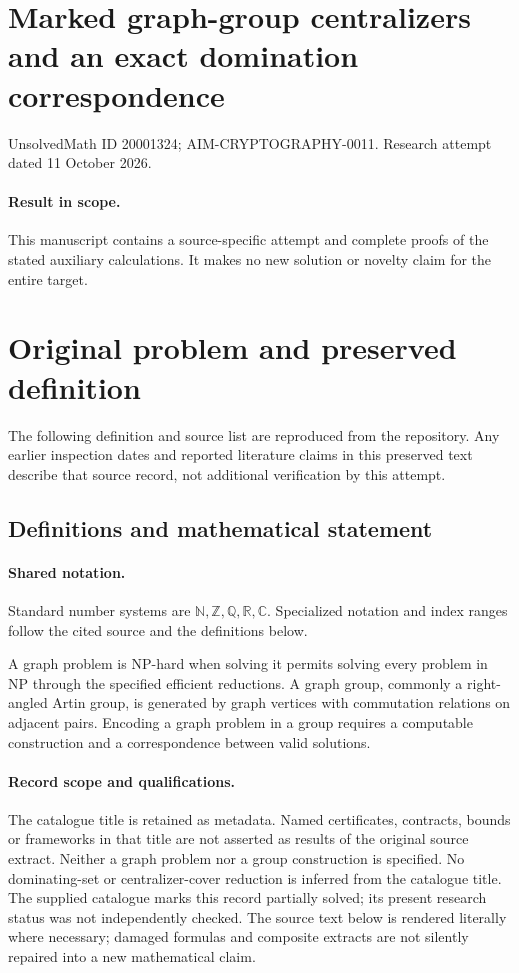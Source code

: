 \documentclass[11pt]{article}
\begin{document}
\section*{Marked graph-group centralizers and an exact domination correspondence}
\noindent UnsolvedMath ID 20001324; AIM-CRYPTOGRAPHY-0011. Research attempt dated 11 October 2026.
\paragraph{Result in scope.}This manuscript contains a source-specific attempt and complete proofs of the stated auxiliary calculations. It makes no new solution or novelty claim for the entire target.
\section{Original problem and preserved definition}
The following definition and source list are reproduced from the repository. Any earlier inspection dates and reported literature claims in this preserved text describe that source record, not additional verification by this attempt.
\subsection{Definitions and mathematical statement}

\paragraph{Shared notation.}Standard number systems are $\mathbb N,\mathbb Z,\mathbb Q,\mathbb R,\mathbb C$. Specialized notation and index ranges follow the cited source and the definitions below.


A graph problem is NP-hard when solving it permits solving every problem in NP through the specified efficient reductions. A graph group, commonly a right-angled Artin group, is generated by graph vertices with commutation relations on adjacent pairs. Encoding a graph problem in a group requires a computable construction and a correspondence between valid solutions.
\paragraph{Record scope and qualifications.}
The catalogue title is retained as metadata. Named certificates, contracts, bounds or frameworks in that title are not asserted as results of the original source extract.
Neither a graph problem nor a group construction is specified. No dominating-set or centralizer-cover reduction is inferred from the catalogue title. The supplied catalogue marks this record partially solved; its present research status was not independently checked.
The source text below is rendered literally where necessary; damaged formulas and composite extracts are not silently repaired into a new mathematical claim.
\end{document}
